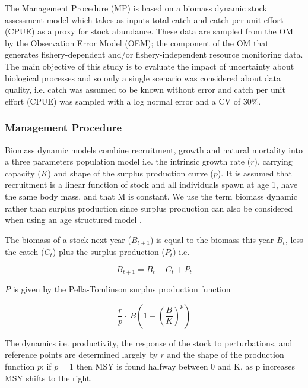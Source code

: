 \documentclass[%
nonumbib,      %
%
]{nrc1}                          %
\begin{document}
The Management Procedure (MP) is based on a biomass dynamic stock assessment model which takes as inputs total catch and catch per unit effort (CPUE) as a proxy for stock abundance. These data are sampled from the OM by the Observation Error Model (OEM);  the component of the OM that generates fishery-dependent and/or fishery-independent resource monitoring data. The main objective of this study is to evaluate the impact of uncertainty about biological processes and so only a single scenario was considered about data quality, i.e. catch was assumed to be known without error and catch per unit effort (CPUE) was sampled with a log normal error and a CV of 30\%.


\subsubsection*{Management Procedure}

Biomass dynamic models combine recruitment, growth and natural mortality into a three parameters population model i.e.  the intrinsic growth rate ($r$), carrying capacity ($K$) and shape of the surplus production curve ($p$).  It is assumed that recruitment is a linear function of stock and all individuals spawn at age 1, have the same body mass, and that M is constant. We use the term biomass dynamic rather than surplus production since surplus production can also be considered when using an age structured model \citep{hilborn1992quantitative}. 

The biomass of a stock next year ($B_{t+1}$) is equal to the biomass this year $B_{t}$, less the catch ($C_t$) plus the surplus production ($P_t$) i.e. 

\begin{equation}  B_{t+1}=B_{t}-C_{t}+P_{t}\end{equation}  

$P$ is given by the Pella-Tomlinson surplus production function \citep{pella1969generalized}

\begin{equation}\frac{r}{p}\cdot~B(1-(\frac{B}{K})^p)\end{equation}  

The dynamics i.e. productivity, the response of the stock to perturbations, and reference points are determined largely by $r$ and the shape of the production function $p$; if $p=1$ then MSY is found halfway between 0 and K, as p increases MSY shifts to the right.
\end{document}
